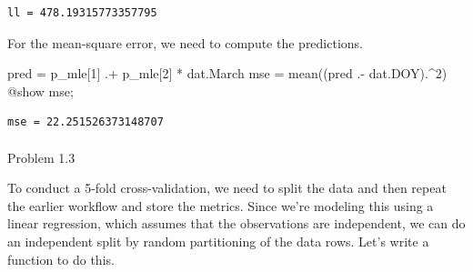 \documentclass[
  letterpaper,
  DIV=11,
  numbers=noendperiod]{scrartcl}
\makeatletter
\let\oldparagraph\paragraph
\renewcommand{\paragraph}{
    \@ifstar
      \xxxParagraphStar
      \xxxParagraphNoStar
  }
\newcommand{\xxxParagraphStar}[1]{\oldparagraph*{#1}\mbox{}}
\newcommand{\xxxParagraphNoStar}[1]{\oldparagraph{#1}\mbox{}}
\newenvironment{Shaded}{\begin{snugshade}}{\end{snugshade}}
\newcommand{\FloatTok}[1]{\textcolor[rgb]{0.68,0.00,0.00}{#1}}
\newcommand{\FunctionTok}[1]{\textcolor[rgb]{0.28,0.35,0.67}{#1}}
\newcommand{\NormalTok}[1]{\textcolor[rgb]{0.00,0.23,0.31}{#1}}
\newcommand{\OperatorTok}[1]{\textcolor[rgb]{0.37,0.37,0.37}{#1}}
\newcommand{\PreprocessorTok}[1]{\textcolor[rgb]{0.68,0.00,0.00}{#1}}
\makeatother
\begin{document}
\begin{verbatim}
ll = 478.19315773357795
\end{verbatim}

For the mean-square error, we need to compute the predictions.

\begin{Shaded}
\begin{Highlighting}[]
\NormalTok{pred }\OperatorTok{=}\NormalTok{ p\_mle[}\FloatTok{1}\NormalTok{] }\OperatorTok{.+}\NormalTok{ p\_mle[}\FloatTok{2}\NormalTok{] }\OperatorTok{*}\NormalTok{ dat.March}
\NormalTok{mse }\OperatorTok{=} \FunctionTok{mean}\NormalTok{((pred }\OperatorTok{.{-}}\NormalTok{ dat.DOY)}\OperatorTok{.\^{}}\FloatTok{2}\NormalTok{)}
\PreprocessorTok{@show}\NormalTok{ mse;}
\end{Highlighting}
\end{Shaded}

\begin{verbatim}
mse = 22.251526373148707
\end{verbatim}

\paragraph{Problem 1.3}\label{problem-1.3}

To conduct a 5-fold cross-validation, we need to split the data and then
repeat the earlier workflow and store the metrics. Since we're modeling
this using a linear regression, which assumes that the observations are
independent, we can do an independent split by random partitioning of
the data rows. Let's write a function to do this.
\end{document}
